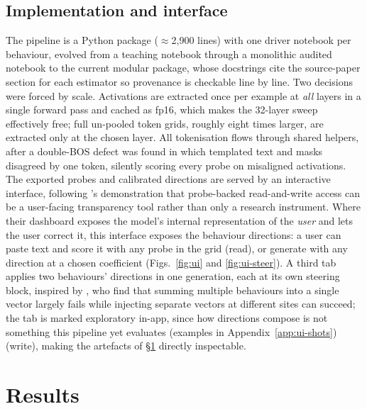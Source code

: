 \documentclass[conference]{IEEEtran}
\begin{document}
\subsection{Implementation and interface}
\label{sec:impl}
The pipeline is a Python package ($\approx$2{,}900 lines) with one driver
notebook per behaviour, evolved from a teaching notebook \citep{arena2024}
through a monolithic audited notebook to the current modular package, whose
docstrings cite the source-paper section for each estimator so provenance is
checkable line by line. Two decisions were forced by scale. Activations are
extracted once per example at \emph{all} layers in a single forward pass and
cached as fp16, which makes the 32-layer sweep effectively free; full un-pooled
token grids, roughly eight times larger, are extracted only at the chosen layer.
All tokenisation flows through shared helpers, after a double-BOS defect was
found in which templated text and masks disagreed by one token, silently scoring
every probe on misaligned activations.
The exported probes and calibrated directions are served by an interactive
interface, following \citet{chen2024}'s demonstration that probe-backed
read-and-write access can be a user-facing transparency tool rather than only a
research instrument. Where their dashboard exposes the model's internal
representation of the \emph{user} and lets the user correct it, this interface
exposes the behaviour directions: a user can paste text and score it with any
probe in the grid (read), or generate with any direction at a chosen coefficient
(Figs.~\ref{fig:ui} and \ref{fig:ui-steer}). A third tab applies two behaviours' directions in one
generation, each at its own steering block, inspired by \citet{vanderweij2024},
who find that summing multiple behaviours into a single vector largely fails
while injecting separate vectors at different sites can succeed; the tab is
marked exploratory in-app, since how directions compose is not something this
pipeline yet evaluates (examples in Appendix~\ref{app:ui-shots})
(write), making the artefacts of §\ref{sec:results} directly inspectable.

\section{Results}
\label{sec:results}
\end{document}

